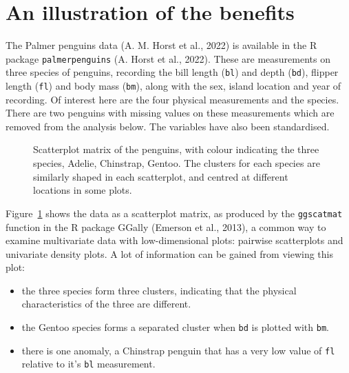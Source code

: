 \documentclass[
  letterpaper,
]{krantz}
\providecommand{\tightlist}{%
  \setlength{\itemsep}{0pt}\setlength{\parskip}{0pt}}\usepackage{longtable,booktabs,array}
\begin{document}
\section{An illustration of the
benefits}\label{an-illustration-of-the-benefits}

The Palmer penguins data (A. M. Horst et al., 2022) is available in the
R package \texttt{palmerpenguins} (A. Horst et al., 2022). These are
measurements on three species of penguins, recording the bill length
(\texttt{bl}) and depth (\texttt{bd}), flipper length (\texttt{fl}) and
body mass (\texttt{bm}), along with the sex, island location and year of
recording. Of interest here are the four physical measurements and the
species. There are two penguins with missing values on these
measurements which are removed from the analysis below. The variables
have also been standardised. 

\begin{figure}


\caption{\label{fig-penguins-scatmat}Scatterplot matrix of the penguins,
with colour indicating the three species, Adelie, Chinstrap, Gentoo. The
clusters for each species are similarly shaped in each scatterplot, and
centred at different locations in some plots.}

\end{figure}%

Figure~\ref{fig-penguins-scatmat} shows the data as a scatterplot
matrix, as produced by the \texttt{ggscatmat} function in the R package
GGally (Emerson et al., 2013), a common way to examine multivariate data
with low-dimensional plots: pairwise scatterplots and univariate density
plots. A lot of information can be gained from viewing this plot:

\begin{itemize}
\tightlist
\item
  the three species form three clusters, indicating that the physical
  characteristics of the three are different.
\item
  the Gentoo species forms a separated cluster when \texttt{bd} is
  plotted with \texttt{bm}.
\item
  there is one anomaly, a Chinstrap penguin that has a very low value of
  \texttt{fl} relative to it's \texttt{bl} measurement.
\end{itemize}
\end{document}
